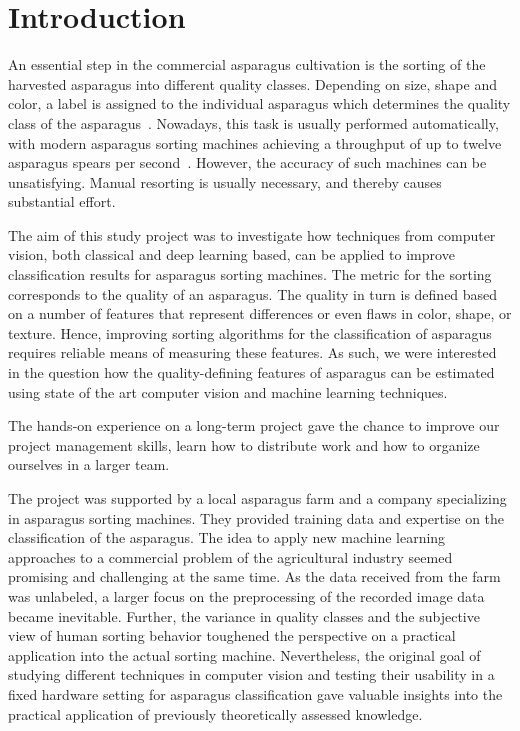 \section{Introduction}
\label{ch:Introduction}

An essential step in the commercial asparagus cultivation is the sorting of the harvested asparagus into different quality classes. Depending on size, shape and color, a label is assigned to the individual asparagus which determines the quality class of the asparagus~\citep{unspargelnorm}. Nowadays, this task is usually performed automatically, with modern asparagus sorting machines achieving a throughput of up to twelve asparagus spears per second~\citep{ting2015zeitalter}. However, the accuracy of such machines can be unsatisfying. Manual resorting is usually necessary, and thereby causes substantial effort.

\bigskip
The aim of this study project was to investigate how techniques from computer vision, both classical and deep learning based, can be applied to improve classification results for asparagus sorting machines. The metric for the sorting corresponds to the quality of an asparagus. The quality in turn is defined based on a number of features that represent differences or even flaws in color, shape, or texture. Hence, improving sorting algorithms for the classification of asparagus requires reliable means of measuring these features. As such, we were interested in the question how the quality-defining features of asparagus can be estimated using state of the art computer vision and machine learning techniques.

The hands-on experience on a long-term project gave the chance to improve our project management skills, learn how to distribute work and how to organize ourselves in a larger team.

The project was supported by a local asparagus farm and a company specializing in asparagus sorting machines. They provided training data and expertise on the classification of the asparagus. The idea to apply new machine learning approaches to a commercial problem of the agricultural industry seemed promising and challenging at the same time. As the data received from the farm was unlabeled, a larger focus on the preprocessing of the recorded image data became inevitable. Further, the variance in quality classes and the subjective view of human sorting behavior toughened the perspective on a practical application into the actual sorting machine. Nevertheless, the original goal of studying different techniques in computer vision and testing their usability in a fixed hardware setting for asparagus classification gave valuable insights into the practical application of previously theoretically assessed knowledge.

